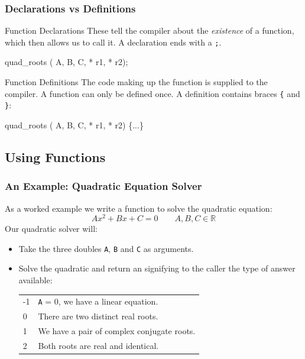 \documentclass[smaller,handout,table]{beamer}
\begin{document}
\begin{frame}[fragile]
\frametitle{Declarations vs Definitions}
\begin{block}{Function Declarations}
These tell the compiler about the \emph{existence} of a function, which then
allows us to call it. A declaration ends with a {\tt ;}.
\begin{semiverbatim}
 quad_roots ( A,  B,  C,
                 * r1,  * r2);
\end{semiverbatim}
\end{block}

\begin{block}{Function Definitions}
The code making up the function is supplied to the compiler. A function can only be defined once. A definition contains braces {\tt \{} and {\tt \}}:
\begin{semiverbatim}
 quad_roots ( A,  B,  C,
                 * r1,  * r2)
\{...\}
\end{semiverbatim}
\end{block}
\end{frame}

\subsection{Using Functions}
\begin{frame}
\frametitle{An Example: Quadratic Equation Solver}
As a worked example we write a function to solve the quadratic equation:
$$ A x^2 + B x + C=0 \qquad A,B,C\in\mathbb{R}$$
Our quadratic solver will:
\begin{itemize}
\item Take the three doubles {\tt A}, {\tt B} and {\tt C} as arguments.
\item Solve the quadratic and return an  signifying to the caller the type of answer available:
\begin{tabular}{l l}
-1&{\tt A} = 0, we have a linear equation.\\
0&There are two distinct real roots.\\
1&We have a pair of complex conjugate roots.\\
2&Both roots are real and identical.
\end{tabular}
\end{itemize}
\end{frame}
\end{document}
